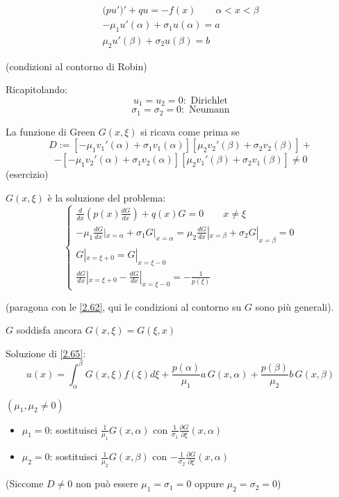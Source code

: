 \documentclass[a4paper,11pt]{report}
\begin{document}
\begin{equation}
\begin{gathered}
\big(pu'\big)' + qu = -f(x) \qquad \alpha<x<\beta\\
-\mu_1 u'(\alpha) + \sigma_1 u(\alpha)=a\\
\mu_2 u'(\beta) + \sigma_2 u(\beta)=b
\end{gathered}
\label{2.65}
\end{equation}
\centerline{(condizioni al contorno di Robin)}

\medskip

Ricapitolando:
\[
u_1=u_2=0:\text{ Dirichlet}
\]
\[
\sigma_1=\sigma_2=0:\text{ Neumann}
\]	

La funzione di Green $G(x,\xi)$ si ricava come prima se
\[
D:=\left[-\mu_1 v_1'(\alpha)+\sigma_1 v_1(\alpha)\right] \left[\mu_2 v_2'(\beta)+\sigma_2 v_2(\beta)\right] +
\]
\[
- \left[-\mu_1 v_2'(\alpha)+\sigma_1 v_2(\alpha)\right] \left[\mu_2 v_1'(\beta)+\sigma_2 v_1(\beta)\right]\neq 0
\]
(esercizio)

$G(x,\xi)$ \`e la soluzione del problema:
\begin{equation}
\begin{cases}
\frac{d}{dx}\left(p(x)\frac{dG}{dx}\right) + q(x)G = 0 \qquad x\neq \xi \\
-\mu_1\frac{dG}{dx}|_{x=\alpha}+\sigma_1 G|_{x=\alpha}=\mu_2\frac{dG}{dx}|_{x=\beta} + \sigma_2 G|_{x=\beta}=0 \\
G|_{x=\xi+0}=G|_{x=\xi-0}\\
\frac{dG}{dx}|_{x=\xi+0}-\frac{dG}{dx}|_{x=\xi-0}=-\frac{1}{p(\xi)}
\end{cases}
\end{equation}

(paragona con le \eqref{2.62}, qui le condizioni al contorno su $G$ sono pi\`u generali).

\smallskip

$G$ soddisfa ancora $G(x,\xi)=G(\xi,x)$

\smallskip

Soluzione di \eqref{2.65}:
\begin{equation}
u(x)=\int_\alpha^\beta G(x,\xi)f(\xi)d\xi + \frac{p(\alpha)}{\mu_1}a\,G(x,\alpha) + \frac{p(\beta)}{\mu_2}b\,G(x,\beta)
\label{2.67}
\end{equation}

$(\mu_1,\mu_2\neq 0)$
\begin{itemize}
\item $\mu_1=0$: sostituisci $\frac{1}{\mu_1}G(x,\alpha)$ con $\frac{1}{\sigma_1}\frac{\partial G}{\partial \xi}(x,\alpha)$
\item $\mu_2=0$: sostituisci $\frac{1}{\mu_2}G(x,\beta)$ con $-\frac{1}{\sigma_2}\frac{\partial G}{\partial \xi}(x,\alpha)$
\end{itemize}
(Siccome $D\neq 0$ non pu\`o essere $\mu_1=\sigma_1=0$ oppure $\mu_2=\sigma_2=0$)
\end{document}
